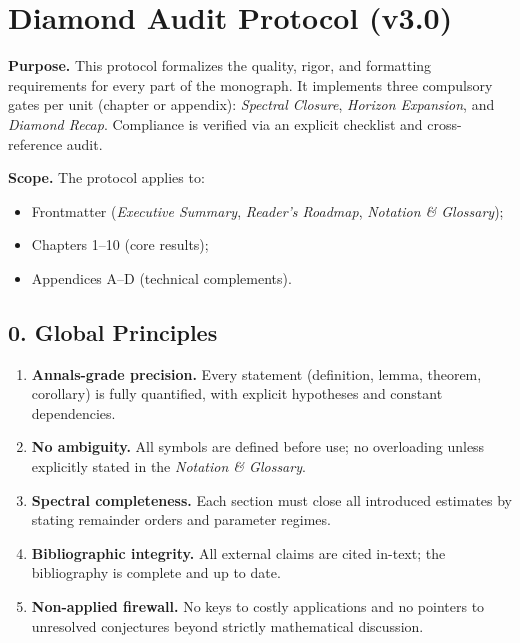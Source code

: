
\chapter*{Diamond Audit Protocol (v3.0)}

\noindent
\textbf{Purpose.} This protocol formalizes the quality, rigor, and formatting requirements for every part of the monograph. It implements three compulsory gates per unit (chapter or appendix): \emph{Spectral Closure}, \emph{Horizon Expansion}, and \emph{Diamond Recap}. Compliance is verified via an explicit checklist and cross-reference audit.

\medskip

\noindent
\textbf{Scope.} The protocol applies to:
\begin{itemize}
  \item Frontmatter (\emph{Executive Summary}, \emph{Reader's Roadmap}, \emph{Notation \& Glossary});
  \item Chapters 1–10 (core results);
  \item Appendices A–D (technical complements).
\end{itemize}

\section*{0. Global Principles}

\begin{enumerate}[label=\textbf{G\arabic*}.]
  \item \textbf{Annals-grade precision.} Every statement (definition, lemma, theorem, corollary) is fully quantified, with explicit hypotheses and constant dependencies.
  \item \textbf{No ambiguity.} All symbols are defined before use; no overloading unless explicitly stated in the \emph{Notation \& Glossary}.
  \item \textbf{Spectral completeness.} Each section must close all introduced estimates by stating remainder orders and parameter regimes.
  \item \textbf{Bibliographic integrity.} All external claims are cited in-text; the bibliography is complete and up to date.
  \item \textbf{Non-applied firewall.} No keys to costly applications and no pointers to unresolved conjectures beyond strictly mathematical discussion.
\end{enumerate}

